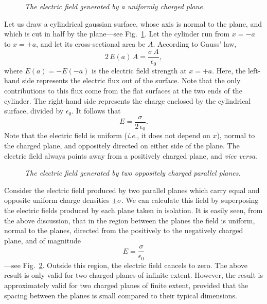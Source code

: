 \begin{figure}[h]
\epsfysize=2.5in
\centerline{}
\caption{\em The electric field generated by a uniformly charged plane.}\label{f4.2b}
\end{figure}

Let us draw a cylindrical gaussian surface, whose axis is normal
to the plane, and which is cut in half by the plane---see Fig.~\ref{f4.2b}. Let the 
cylinder run from $x=-a$ to $x=+a$, and let its cross-sectional
area be $A$. According to Gauss' law,
\begin{equation}
2 \,E(a)\, A = \frac{\sigma\, A}{\epsilon_0},
\end{equation}
where $E(a)=-E(-a)$ is the electric field strength at $x=+a$. 
Here,  the left-hand side represents the electric flux out of the surface. Note that the
only contributions to this flux come from the flat surfaces at the two ends of the cylinder.
The right-hand side represents the charge enclosed by the cylindrical
surface, divided by $\epsilon_0$. It follows that
\begin{equation}\label{e4.8}
E = \frac{\sigma}{2\,\epsilon_0}.
\end{equation}
Note that the electric field is uniform ({\em i.e.}, it does not
depend on $x$), normal to the charged plane,
and oppositely directed on either side of the plane. The electric field always
points away from a positively charged plane, and {\em vice versa}. 

\begin{figure}[h]
\epsfysize=2in
\centerline{}
\caption{\em The electric field generated by two oppositely charged parallel
planes.}\label{f4.3}
\end{figure}

Consider the electric field produced by two parallel planes which carry equal
and opposite uniform charge densities $\pm \sigma$. We can calculate this field
by superposing the electric
fields produced by each plane taken in isolation. It is easily seen,
from the above discussion,  that in the region  between
the planes the field is uniform, normal to the planes, directed from the
positively to the negatively charged plane, and of magnitude
\begin{equation}
E= \frac{\sigma}{\epsilon_0}
\end{equation}
---see Fig.~\ref{f4.3}.
Outside this region,  the electric field cancels to zero. 
The above result is only valid for two charged planes of infinite extent. However,
the result is approximately valid for two charged planes of finite extent, provided
that the spacing between the planes is small compared to their typical dimensions. 

